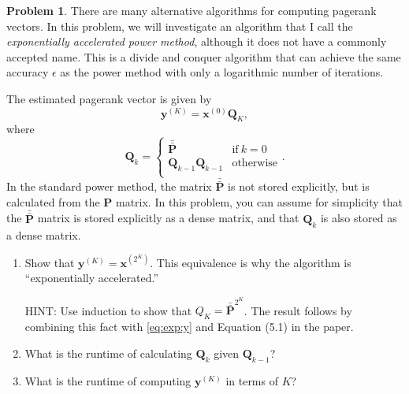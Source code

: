 \documentclass[10pt]{article}
\theoremstyle{definition}
\newtheorem{problem}{Problem}
\newcommand{\Q}{\mathbf Q}
\newcommand{\p}{\mathbf P}
\newcommand{\pb}{\bar {\p}}
\newcommand{\pbb}{\bar {\pb}}
\newcommand{\x}{\mathbf x}
\newcommand{\y}{\mathbf y}
\begin{document}
\newpage
\begin{problem}
    There are many alternative algorithms for computing pagerank vectors.
    In this problem, we will investigate an algorithm that I call the \emph{exponentially accelerated power method},
    although it does not have a commonly accepted name.
    This is a divide and conquer algorithm that can achieve the same accuracy $\epsilon$ as the power method with only a logarithmic number of iterations.

    The estimated pagerank vector is given by
    \begin{equation}
        \label{eq:exp:y}
        \y^{(K)} = \x^{(0)} \Q_K
        ,
    \end{equation}
    where
    \begin{equation}
        \Q_k = 
        \begin{cases}
            \pbb & \text{if}~k=0 \\
            \Q_{k-1} \Q_{k-1} & \text{otherwise} \\
        \end{cases}
        .
    \end{equation}
    In the standard power method, the matrix $\pbb$ is not stored explicitly,
    but is calculated from the $\p$ matrix.
    In this problem, you can assume for simplicity that the $\pbb$ matrix is stored explicitly as a dense matrix,
    and that $\Q_k$ is also stored as a dense matrix.

    \begin{enumerate}
        \item
            Show that $\y^{(K)} = \x^{(2^K)}$.
            This equivalence is why the algorithm is ``exponentially accelerated.''

            HINT: 
            Use induction to show that $Q_{K} = \pbb^{2^{K}}$.
            The result follows by combining this fact with \eqref{eq:exp:y} and Equation (5.1) in the paper.
            \vspace{3in}

        \newpage
        \item
            What is the runtime of calculating $\Q_k$ given $\Q_{k-1}$? 
            \vspace{4in}

        \item 
            What is the runtime of computing $\y^{(K)}$ in terms of $K$?
            \vspace{3in}


\end{enumerate}
\end{problem}
\end{document}
